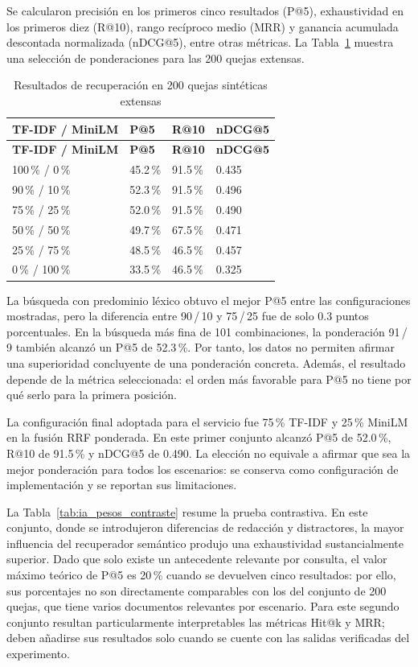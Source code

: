 Se calcularon precisión en los primeros cinco resultados (P@5), exhaustividad en los primeros
diez (R@10), rango recíproco medio (MRR) y ganancia acumulada descontada normalizada
(nDCG@5), entre otras métricas. La Tabla~\ref{tab:ia_pesos_200} muestra una selección de
ponderaciones para las 200 quejas extensas.

\begin{longtable}{|p{3.8cm}|p{2.6cm}|p{2.6cm}|p{2.6cm}|}
\caption{Resultados de recuperación en 200 quejas sintéticas extensas}
\label{tab:ia_pesos_200} \\
\hline
\textbf{TF-IDF / MiniLM} & \textbf{P@5} & \textbf{R@10} & \textbf{nDCG@5} \\
\hline
\endfirsthead
\hline
\textbf{TF-IDF / MiniLM} & \textbf{P@5} & \textbf{R@10} & \textbf{nDCG@5} \\
\hline
\endhead
100\,\% / 0\,\% & 45.2\,\% & 91.5\,\% & 0.435 \\ \hline
90\,\% / 10\,\% & 52.3\,\% & 91.5\,\% & 0.496 \\ \hline
75\,\% / 25\,\% & 52.0\,\% & 91.5\,\% & 0.490 \\ \hline
50\,\% / 50\,\% & 49.7\,\% & 67.5\,\% & 0.471 \\ \hline
25\,\% / 75\,\% & 48.5\,\% & 46.5\,\% & 0.457 \\ \hline
0\,\% / 100\,\% & 33.5\,\% & 46.5\,\% & 0.325 \\ \hline
\end{longtable}

La búsqueda con predominio léxico obtuvo el mejor P@5 entre las configuraciones mostradas,
pero la diferencia entre 90\,/\,10 y 75\,/\,25 fue de solo 0.3 puntos porcentuales. En la
búsqueda más fina de 101 combinaciones, la ponderación 91\,/\,9 también alcanzó un P@5
de 52.3\,\%. Por tanto, los datos no permiten afirmar una superioridad concluyente de una
ponderación concreta. Además, el resultado depende de la métrica seleccionada: el orden más
favorable para P@5 no tiene por qué serlo para la primera posición.

La configuración final adoptada para el servicio fue 75\,\% TF-IDF y
25\,\% MiniLM en la fusión RRF ponderada. En este primer conjunto alcanzó
P@5 de 52.0\,\%, R@10 de 91.5\,\% y nDCG@5 de 0.490. La elección
no equivale a afirmar que sea la mejor ponderación para todos los escenarios: se
conserva como configuración de implementación y se reportan sus limitaciones.

La Tabla~\ref{tab:ia_pesos_contraste} resume la prueba contrastiva. En este conjunto, donde
se introdujeron diferencias de redacción y distractores, la mayor influencia del recuperador
semántico produjo una exhaustividad sustancialmente superior. Dado que solo existe
un antecedente relevante por consulta, el valor máximo teórico de P@5 es 20\,\%
cuando se devuelven cinco resultados: por ello, sus porcentajes no son directamente
comparables con los del conjunto de 200 quejas, que tiene varios documentos
relevantes por escenario. Para este segundo conjunto resultan particularmente
interpretables las métricas Hit@k y MRR; deben añadirse sus resultados solo
cuando se cuente con las salidas verificadas del experimento.

